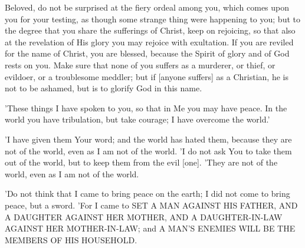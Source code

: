 \vspace{2\baselineskip}

\begin{scripture}[1 Peter 4:12-16]
    Beloved, do not be surprised at the fiery ordeal among you, which comes upon you for your testing, as though some strange thing were happening to you;
    but to the degree that you share the sufferings of Christ, keep on rejoicing, so that also at the revelation of His glory you may rejoice with exultation.
    If you are reviled for the name of Christ, you are blessed, because the Spirit of glory and of God rests on you.
    Make sure that none of you suffers as a murderer, or thief, or evildoer, or a troublesome meddler;
    but if [anyone suffers] as a Christian, he is not to be ashamed, but is to glorify God in this name.
\end{scripture}

\vspace{2\baselineskip}

\begin{scripture}[John 16:33]
    'These things I have spoken to you, so that in Me you may have peace. In the world you have tribulation, but take courage; I have overcome the world.'
\end{scripture}

\vspace{2\baselineskip}

\begin{scripture}[John 17:14-16]
    'I have given them Your word; and the world has hated them, because they are not of the world, even as I am not of the world.
    'I do not ask You to take them out of the world, but to keep them from the evil [one].
    'They are not of the world, even as I am not of the world.
\end{scripture}

\vspace{2\baselineskip}

\begin{scripture}[Matthew 10:34-36]
    'Do not think that I came to bring peace on the earth; I did not come to bring peace, but a sword.
    'For I came to SET A MAN AGAINST HIS FATHER, AND A DAUGHTER AGAINST HER MOTHER, AND A DAUGHTER-IN-LAW AGAINST HER MOTHER-IN-LAW;
    and A MAN'S ENEMIES WILL BE THE MEMBERS OF HIS HOUSEHOLD.
\end{scripture}

\vspace{2\baselineskip}

